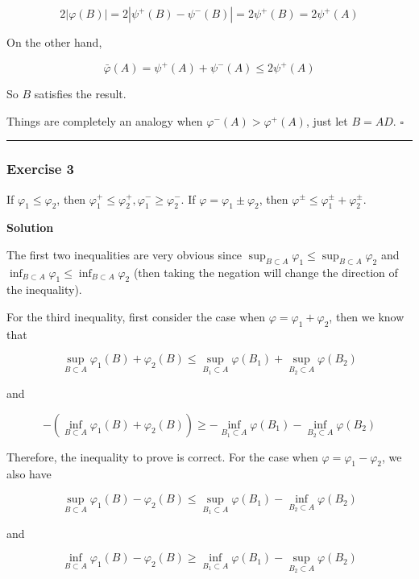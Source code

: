 \documentclass[
]{article}
\begin{document}
\[2|\varphi(B)| = 2|\psi^+(B) - \psi^-(B)| = 2\psi^+(B) = 2\psi^+(A)\]

On the other hand,

\[\bar \varphi(A) = \psi^+(A) + \psi^-(A) \le 2 \psi^+(A)\]

So \(B\) satisfies the result.

Things are completely an analogy when \(\varphi^-(A) > \varphi^+(A)\),
just let \(B = AD\). \(\square\)

\begin{center}\rule{0.5\linewidth}{0.5pt}\end{center}

\hypertarget{exercise-3}{%
  \subsubsection{\texorpdfstring{Exercise 3
    }{Exercise 3 }}\label{exercise-3}}

If \(\varphi_1 \le \varphi_2\), then
\(\varphi_1^{+} \le \varphi_2^{+}, \varphi_1^{-} \ge \varphi_2^{-}\). If
\(\varphi=\varphi_1 \pm \varphi_2\), then
\(\varphi^{\pm} \le \varphi_1 ^\pm+\varphi_2 ^\pm\).

\textbf{Solution}

The first two inequalities are very obvious since
\(\sup_{B\subset A} \varphi_1 \le \sup_{B\subset A} \varphi_2\) and
\(\inf_{B\subset A} \varphi_1 \le \inf_{B\subset A} \varphi_2 \) (then
taking the negation will change the direction of the inequality).

For the third inequality, first consider the case when
\(\varphi = \varphi_1 + \varphi_2\), then we know that

\[\sup_{B\subset A} \varphi_1(B) + \varphi_2(B) \le  \sup_{B_1\subset A} \varphi(B_1) + \sup_{B_2\subset A} \varphi(B_2)\]

and

\[-(\inf_{B\subset A} \varphi_1(B) + \varphi_2(B)) \ge  -\inf_{B_1\subset A} \varphi(B_1) - \inf_{B_2\subset A} \varphi(B_2)\]

Therefore, the inequality to prove is correct. For the case when
\(\varphi = \varphi_1 - \varphi_2\), we also have

\[\sup_{B\subset A} \varphi_1(B) - \varphi_2(B) \le  \sup_{B_1\subset A} \varphi(B_1) - \inf_{B_2\subset A} \varphi(B_2)\]

and

\[\inf_{B\subset A} \varphi_1(B) - \varphi_2(B) \ge  \inf_{B_1\subset A} \varphi(B_1) - \sup_{B_2\subset A} \varphi(B_2)\]
\end{document}
